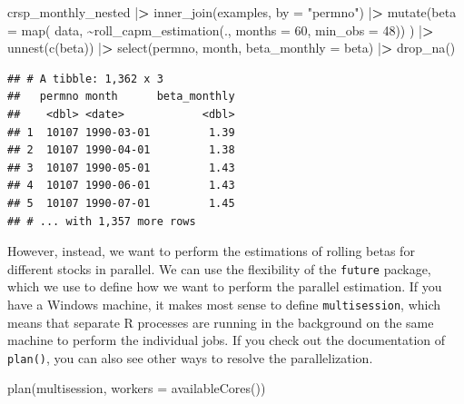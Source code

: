 \documentclass[
]{book}
\newenvironment{Shaded}{\begin{snugshade}}{\end{snugshade}}
\newcommand{\AttributeTok}[1]{\textcolor[rgb]{0.61,0.61,0.61}{#1}}
\newcommand{\DecValTok}[1]{\textcolor[rgb]{0.06,0.06,0.06}{#1}}
\newcommand{\ErrorTok}[1]{\textcolor[rgb]{0.14,0.14,0.14}{\textbf{#1}}}
\newcommand{\FunctionTok}[1]{\textcolor[rgb]{0,0,0}{#1}}
\newcommand{\NormalTok}[1]{#1}
\newcommand{\SpecialCharTok}[1]{\textcolor[rgb]{0,0,0}{#1}}
\newcommand{\StringTok}[1]{\textcolor[rgb]{0.5,0.5,0.5}{#1}}
\begin{document}
\begin{Shaded}
\begin{Highlighting}[]
\NormalTok{crsp\_monthly\_nested }\SpecialCharTok{|}\ErrorTok{\textgreater{}}
  \FunctionTok{inner\_join}\NormalTok{(examples, }\AttributeTok{by =} \StringTok{"permno"}\NormalTok{) }\SpecialCharTok{|}\ErrorTok{\textgreater{}}
  \FunctionTok{mutate}\NormalTok{(}\AttributeTok{beta =} \FunctionTok{map}\NormalTok{(}
\NormalTok{    data, }
    \SpecialCharTok{\textasciitilde{}}\FunctionTok{roll\_capm\_estimation}\NormalTok{(., }\AttributeTok{months =} \DecValTok{60}\NormalTok{, }\AttributeTok{min\_obs =} \DecValTok{48}\NormalTok{))}
\NormalTok{    ) }\SpecialCharTok{|}\ErrorTok{\textgreater{}}
  \FunctionTok{unnest}\NormalTok{(}\FunctionTok{c}\NormalTok{(beta)) }\SpecialCharTok{|}\ErrorTok{\textgreater{}}
  \FunctionTok{select}\NormalTok{(permno, month, }\AttributeTok{beta\_monthly =}\NormalTok{ beta) }\SpecialCharTok{|}\ErrorTok{\textgreater{}}
  \FunctionTok{drop\_na}\NormalTok{()}
\end{Highlighting}
\end{Shaded}

\begin{verbatim}
## # A tibble: 1,362 x 3
##   permno month      beta_monthly
##    <dbl> <date>            <dbl>
## 1  10107 1990-03-01         1.39
## 2  10107 1990-04-01         1.38
## 3  10107 1990-05-01         1.43
## 4  10107 1990-06-01         1.43
## 5  10107 1990-07-01         1.45
## # ... with 1,357 more rows
\end{verbatim}

However, instead, we want to perform the estimations of rolling betas for different stocks in parallel. We can use the flexibility of the \texttt{future} package, which we use to define how we want to perform the parallel estimation. If you have a Windows machine, it makes most sense to define \texttt{multisession}, which means that separate R processes are running in the background on the same machine to perform the individual jobs. If you check out the documentation of \texttt{plan()}, you can also see other ways to resolve the parallelization.

\begin{Shaded}
\begin{Highlighting}[]
\FunctionTok{plan}\NormalTok{(multisession, }\AttributeTok{workers =} \FunctionTok{availableCores}\NormalTok{())}
\end{Highlighting}
\end{Shaded}
\end{document}
